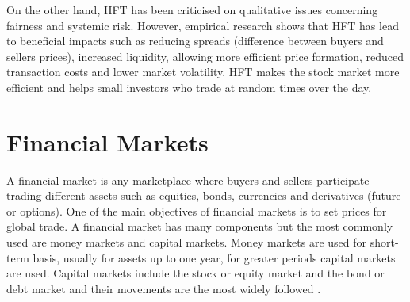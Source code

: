 On the other hand, HFT has been criticised on qualitative issues concerning
fairness and systemic risk. However, empirical research shows that HFT has lead to
beneficial impacts such as reducing spreads (difference between buyers and
sellers prices), increased liquidity, allowing more efficient price formation,
reduced transaction costs and lower market volatility. HFT makes the stock market more efficient and helps small investors who trade at random times over the day. 


\section{Financial Markets}

A financial market is any marketplace where buyers and sellers participate
trading different assets such as equities, bonds, currencies and derivatives
(future or options). One of the main objectives of financial markets is to set
prices for global trade.
A financial market has many components but the most commonly used are money
markets and capital markets. Money markets are used for short-term basis,
usually for assets up to one year, for greater periods capital markets are used.
Capital markets include the stock or equity market and the bond or debt market
and their movements are the most widely followed \cite{aldridge2009}.

